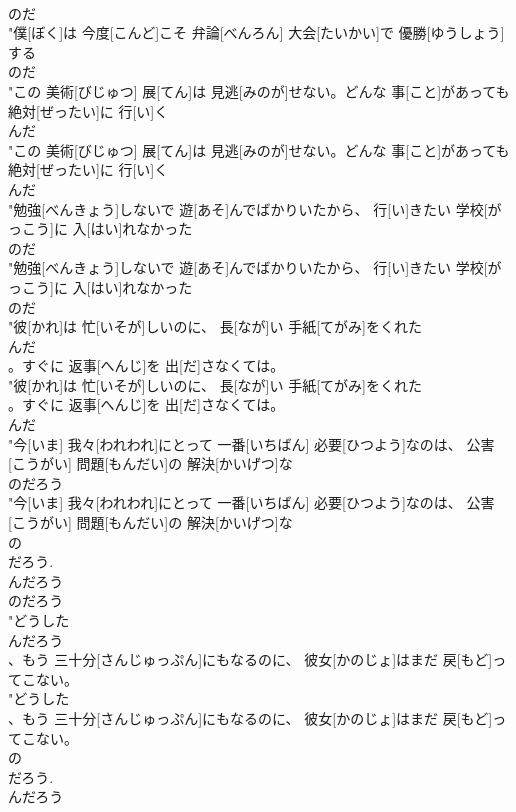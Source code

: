 \documentclass[8pt]{extreport}
\begin{document}
\begin{CJK}{UTF8}{min}
\\	のだ
\\	"僕[ぼく]は 今度[こんど]こそ 弁論[べんろん] 大会[たいかい]で 優勝[ゆうしょう]する
\\	のだ
\\	"この 美術[びじゅつ] 展[てん]は 見逃[みのが]せない。どんな 事[こと]があっても 絶対[ぜったい]に 行[い]く
\\	んだ
\\	"この 美術[びじゅつ] 展[てん]は 見逃[みのが]せない。どんな 事[こと]があっても 絶対[ぜったい]に 行[い]く
\\	んだ
\\	"勉強[べんきょう]しないで 遊[あそ]んでばかりいたから、 行[い]きたい 学校[がっこう]に 入[はい]れなかった
\\	のだ
\\	"勉強[べんきょう]しないで 遊[あそ]んでばかりいたから、 行[い]きたい 学校[がっこう]に 入[はい]れなかった
\\	のだ
\\	"彼[かれ]は 忙[いそが]しいのに、 長[なが]い 手紙[てがみ]をくれた
\\	んだ
\\	。すぐに 返事[へんじ]を 出[だ]さなくては。
\\	"彼[かれ]は 忙[いそが]しいのに、 長[なが]い 手紙[てがみ]をくれた
\\	。すぐに 返事[へんじ]を 出[だ]さなくては。
\\	んだ
\\	"今[いま] 我々[われわれ]にとって 一番[いちばん] 必要[ひつよう]なのは、 公害[こうがい] 問題[もんだい]の 解決[かいげつ]な
\\	のだろう
\\	"今[いま] 我々[われわれ]にとって 一番[いちばん] 必要[ひつよう]なのは、 公害[こうがい] 問題[もんだい]の 解決[かいげつ]な
\\	の 
\\	だろう. 
\\	んだろう	
\\	のだろう
\\	"どうした
\\	んだろう
\\	、もう 三十分[さんじゅっぷん]にもなるのに、 彼女[かのじょ]はまだ 戻[もど]ってこない。
\\	"どうした
\\	、もう 三十分[さんじゅっぷん]にもなるのに、 彼女[かのじょ]はまだ 戻[もど]ってこない。
\\	の 
\\	だろう. 
\\	んだろう	

\end{CJK}
\end{document}
